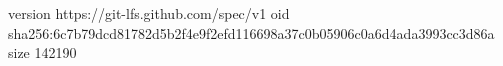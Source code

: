 version https://git-lfs.github.com/spec/v1
oid sha256:6c7b79dcd81782d5b2f4e9f2efd116698a37c0b05906c0a6d4ada3993cc3d86a
size 142190
